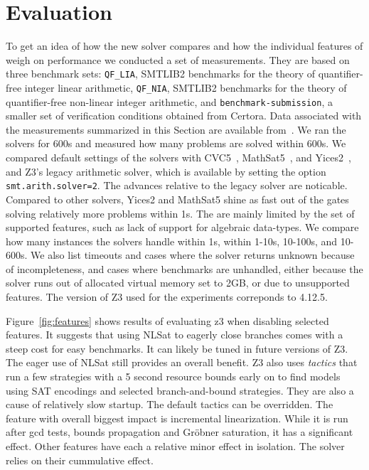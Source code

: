 \section{Evaluation}
\label{sec:eval}

To get an idea of how the new solver compares and how the individual features of weigh on performance
we conducted a set of measurements. They are based on three benchmark sets: {\tt QF\_LIA}, SMTLIB2 benchmarks for the theory of quantifier-free integer linear arithmetic,
{\tt QF\_NIA}, SMTLIB2 benchmarks for the theory of quantifier-free non-linear integer arithmetic, and {\tt benchmark-submission}, a smaller set of verification
conditions obtained from Certora.
Data associated with the measurements summarized in this Section are available from~\cite{z3data}.
We ran the solvers for 600s and measured how many problems are solved within 600s.
We compared default settings of the solvers
with CVC5~\cite{DBLP:conf/tacas/BarbosaBBKLMMMN22,DBLP:conf/cade/KremerRBT22,cvc5tool},
MathSat5~\cite{DBLP:conf/tacas/CimattiGSS13,mathsattool}, and Yices2~\cite{DBLP:conf/cav/Dutertre14,yicestool}, and Z3's legacy arithmetic solver,
which is available by setting the option {\tt smt.arith.solver=2}. The advances relative to the legacy solver are noticable. Compared to other solvers,
Yices2 and MathSat5 shine as fast out of the gates solving relatively more problems within 1s.
The are mainly limited by the set of supported features, such as lack of support for algebraic data-types.
We compare how many instances the solvers handle within
1s, within 1-10s, 10-100s, and 10-600s. We also list
timeouts and cases where the solver returns unknown because of incompleteness,
and cases where benchmarks are unhandled, either because the solver runs out of allocated virtual memory set to 2GB,
or due to unsupported features. The version of Z3 used for the experiments correponds to 4.12.5.

Figure~\ref{fig:features} shows results of evaluating z3 when disabling selected features.
It suggests that using NLSat to eagerly close branches comes with a steep cost for easy benchmarks.
It can likely be tuned in future versions of Z3. The eager use of NLSat still provides an overall benefit. Z3 also uses \emph{tactics} that run
a few strategies with a 5 second resource bounds early on to find models using SAT encodings and selected branch-and-bound strategies. They are also
a cause of relatively slow startup. The default tactics can be overridden. The feature with overall biggest impact is incremental
linearization. While it is run after gcd tests, bounds propagation and Gr{\"o}bner saturation, it has a significant effect.
Other features have each a relative minor effect in isolation. The solver relies on their cummulative effect.



